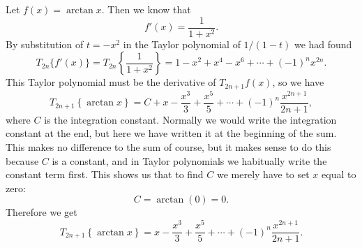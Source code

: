 Let $f(x)=\arctan x$.  Then we know that
\[
f' (x) = \frac 1{1+x^2}.
\]
By substitution of $t=-x^2$ in the Taylor polynomial of $1/ (1-t)$ we had
found
\[
T_{2n}\{f'(x)\} = T_{2n}\left\{\frac1{1+x^2}\right\} = 1-x^2+x^4-x^6+\cdots+
(-1)^nx^{2n}.
\]
This Taylor polynomial must be the derivative of $T_{2n+1}f(x)$, so we have
\[
T_{2n+1}\left\{\arctan x\right\} = C+x-\frac{x^3}3+\frac{x^5}5+\cdots+
(-1)^n\frac{x^{2n+1}} {2n+1},
\]
where $C$ is the integration constant.  Normally we would write the integration
constant at the end, but here we have written it at the beginning of the sum.
This makes no difference to the sum of course, but it makes sense to do this
because $C$ is a constant, and in Taylor polynomials we habitually write the
constant term first.  This shows us that to find $C$ we merely have to set
$x$ equal to zero:
\[
  C = \arctan(0) = 0.
\]
Therefore we get
\[
T_{2n+1}\left\{\arctan x\right\} = x-\frac{x^3}3+\frac{x^5}5+\cdots+
(-1)^n\frac{x^{2n+1}} {2n+1}.
\]



